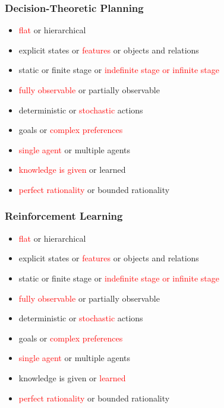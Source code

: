 \documentclass[UTF8,11pt,colorlinks,compress,openany]{beamer}%
\begin{document}
\begin{frame}\frametitle{Decision-Theoretic Planning}
\begin{itemize}
	\item \textcolor{red}{flat} or hierarchical
	\item explicit states or \textcolor{red}{features} or objects and relations
	\item static or finite stage or \textcolor{red}{indefinite stage or infinite stage}
	\item \textcolor{red}{fully observable} or partially observable
	\item deterministic or \textcolor{red}{stochastic} actions
	\item goals or \textcolor{red}{complex preferences}
	\item \textcolor{red}{single agent} or multiple agents
	\item \textcolor{red}{knowledge is given} or learned
	\item \textcolor{red}{perfect rationality} or bounded rationality
\end{itemize}
\end{frame}

\begin{frame}\frametitle{Reinforcement Learning}
\begin{itemize}
	\item \textcolor{red}{flat} or hierarchical
	\item explicit states or \textcolor{red}{features} or objects and relations
	\item static or finite stage or \textcolor{red}{indefinite stage or infinite stage}
	\item \textcolor{red}{fully observable} or partially observable
	\item deterministic or \textcolor{red}{stochastic} actions
	\item goals or \textcolor{red}{complex preferences}
	\item \textcolor{red}{single agent} or multiple agents
	\item knowledge is given or \textcolor{red}{learned}
	\item \textcolor{red}{perfect rationality} or bounded rationality
\end{itemize}
\end{frame}
\end{document}
